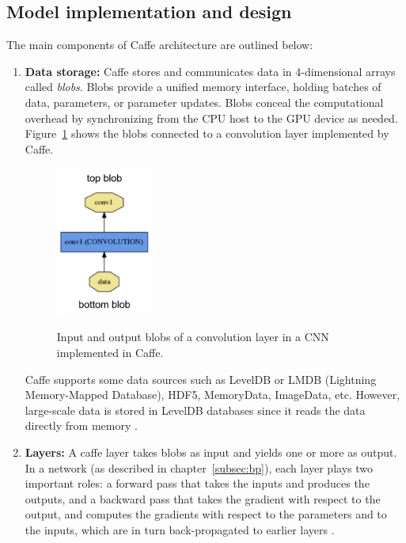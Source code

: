 \subsection{Model implementation and design}
The main components of Caffe architecture are outlined below:
\begin{enumerate}

\item \textbf{Data storage:} Caffe stores and communicates data in 4-dimensional arrays called \textit{blobs}. Blobs provide a unified memory interface, holding batches of data, parameters, or parameter updates. Blobs conceal the computational overhead by synchronizing from the CPU host to the GPU device as needed. Figure~\ref{fig:blob} shows the blobs connected to a convolution layer implemented by Caffe.


\begin{figure}[H]
	\centering
	{\includegraphics[width=0.3\textwidth]{images/blob}}
	\caption{Input and output blobs of a convolution layer in a CNN implemented in Caffe.}
	\label{fig:blob}
\end{figure}


Caffe supports some data sources such as LevelDB or LMDB (Lightning Memory-Mapped Database), HDF5, MemoryData, ImageData, etc. However, large-scale data is stored in LevelDB databases since it reads the data directly from memory \cite{caffe}. 
\item \textbf{Layers:} A caffe layer takes blobs as input and yields one or more as output. In a network (as described in chapter~\ref{subsec:bp}), each layer plays two important roles: a forward pass that takes the inputs and produces the outputs, and a backward pass that takes the gradient with respect to the output, and computes the gradients with respect to the parameters and to the inputs, which are in turn back-propagated to earlier layers \cite{jia2014caffe}.


\end{enumerate}

